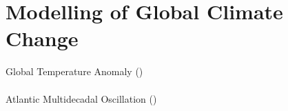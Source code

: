 \section[Climate 2]{Modelling of Global Climate Change}
\begin{slide}
  \begin{center}
    {\footnotesize Global Temperature Anomaly (\GTA)}\\
    \\
    {\footnotesize Atlantic Multidecadal Oscillation (\AMO)}\\
  \end{center} 
\end{slide}

